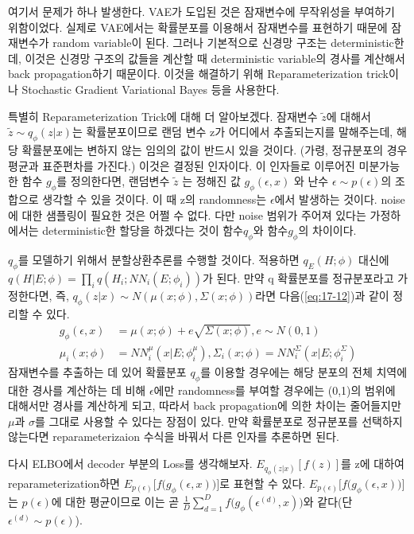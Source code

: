 \documentclass[draft=false]{oblivoir}
\begin{document}
여기서 문제가 하나 발생한다. VAE가 도입된 것은 잠재변수에 무작위성을 부여하기 위함이었다. 실제로 VAE에서는 확률분포를 이용해서 잠재변수를 표현하기 때문에 잠재변수가 random variable이 된다. 그러나 기본적으로 신경망 구조는 deterministic한데, 이것은 신경망 구조의 값들을 계산할 때 deterministic variable의 경사를 계산해서 back propagation하기 때문이다. 이것을 해결하기 위해 Reparameterization trick이나 Stochastic Gradient Variational Bayes 등을 사용한다.

특별히 Reparameterization Trick에 대해 더 알아보겠다. 잠재변수 $\tilde{z}$에 대해서 $\tilde{z}\sim q_\phi (z|x)$는 확률분포이므로 랜덤 변수 z가 어디에서 추출되는지를 말해주는데, 해당 확률분포에는 변하지 않는 임의의 값이 반드시 있을 것이다. (가령, 정규분포의 경우 평균과 표준편차를 가진다.) 이것은 결정된 인자이다. 이 인자들로 이루어진 미분가능한 함수 $g_\phi$를 정의한다면, 랜덤변수 $\tilde{z}$ 는 정해진 값 $g_\phi (\epsilon, x)$ 와 난수 $\epsilon \sim p(\epsilon)$의 조합으로 생각할 수 있을 것이다. 이 때 z의 randomness는 $\epsilon$에서 발생하는 것이다. noise에 대한 샘플링이 필요한 것은 어쩔 수 없다. 다만 noise 범위가 주어져 있다는 가정하에서는 deterministic한 할당을 하겠다는 것이 함수$q_\phi$와 함수$g_\phi$의 차이이다.

$q_\phi$를 모델하기 위해서 분할상환추론를 수행할 것이다. 적용하면 $q_E (H;\phi)$ 대신에 $q(H|E;\phi) = \prod_i q(H_i; NN_i (E;\phi_i))$가 된다. 만약 q 확률분포를 정규분포라고 가정한다면, 즉, $q_\phi (z|x)\sim N(\mu(x;\phi), \Sigma(x;\phi))$라면 다음(\ref{eq:17-12})과 같이 정리할 수 있다.
\begin{equation}
	\begin{split}
	g_\phi (\epsilon, x) &= \mu(x;\phi) + e\sqrt{\Sigma(x;\phi)}, e\sim N(0,1) \\
	\mu_i(x; \phi) &= NN_{i}^{\mu}(x|E;\phi^{\mu}_i), \Sigma_i (x;\phi) = NN_{i}^{\Sigma} (x|E;\phi_{i}^{\Sigma}) 
	\end{split}
	\label{eq:17-12}
\end{equation}
잠재변수를 추출하는 데 있어 확률분포 $q_\phi$를 이용할 경우에는 해당 분포의 전체 치역에 대한 경사를 계산하는 데 비해 $\epsilon$에만 randomness를 부여할 경우에는 (0,1)의 범위에 대해서만 경사를 계산하게 되고, 따라서 back propagation에 의한 차이는 줄어들지만 $\mu$과 $\sigma$를 그대로 사용할 수 있다는 장점이 있다. 만약 확률분포로 정규분포를 선택하지 않는다면 reparameterizaion 수식을 바꿔서 다른 인자를 추론하면 된다.

다시 ELBO에서 decoder 부분의 Loss를 생각해보자. $E_{q_\phi(z|x)} [f(z)]$를 z에 대하여 reparameterization하면 $E_{p(\epsilon)} \Big[f\Big(g_\phi(\epsilon,x)\Big)\Big]$로 표현할 수 있다. $E_{p(\epsilon)} \Big[f\Big(g_\phi(\epsilon,x)\Big)\Big]$는 $p(\epsilon)$에 대한 평균이므로 이는 곧 $\frac{1}{D}\sum_{d=1}^{D}f\Big(g_\phi (\epsilon^{(d)},x)\Big)$와 같다(단 $\epsilon^{(d)}\sim p(\epsilon)$).
\end{document}
